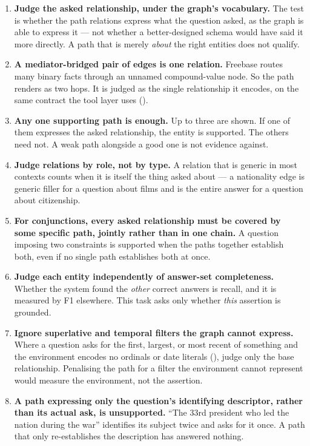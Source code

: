\begin{enumerate}
\item \textbf{Judge the asked relationship, under the graph's vocabulary.} The
test is whether the path relations express what the question asked, as the graph
is able to express it --- not whether a better-designed schema would have said
it more directly. A path that is merely \emph{about} the right entities does not
qualify.
\item \textbf{A mediator-bridged pair of edges is one relation.} Freebase routes
many binary facts through an unnamed compound-value node. So the path renders as
two hops. It is judged as the single relationship it encodes, on the same
contract the tool layer uses ().
\item \textbf{Any one supporting path is enough.} Up to three are shown. If one
of them expresses the asked relationship, the entity is supported. The others
need not. A weak path alongside a good one is not evidence against.
\item \textbf{Judge relations by role, not by type.} A relation that is generic
in most contexts counts when it is itself the thing asked about --- a
\textsf{nationality} edge is generic filler for a question about films and is
the entire answer for a question about citizenship.
\item \textbf{For conjunctions, every asked relationship must be covered by some
specific path, jointly rather than in one chain.} A question imposing two
constraints is supported when the paths together establish both, even if no
single path establishes both at once.
\item \textbf{Judge each entity independently of answer-set completeness.}
  Whether the system found the \emph{other} correct answers is recall, and it is
  measured by F1 elsewhere. This task asks only whether \emph{this} assertion is
  grounded.
\item \textbf{Ignore superlative and temporal filters the graph cannot express.}
  Where a question asks for the first, largest, or most recent of something and
  the environment encodes no ordinals or date literals
  (), judge only the base relationship. Penalising the
  path for a filter the environment cannot represent would measure the
  environment, not the assertion.
\item \textbf{A path expressing only the question's identifying descriptor,
rather than its actual ask, is unsupported.} ``The 33rd president who led the
nation during the war'' identifies its subject twice and asks for it once. A
path that only re-establishes the description has answered nothing.
\end{enumerate}

